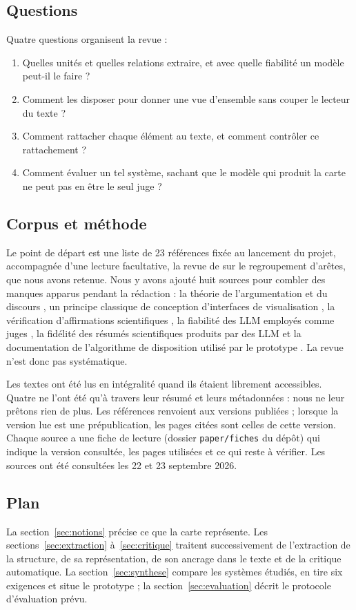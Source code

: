 \subsection{Questions}

Quatre questions organisent la revue :
\begin{enumerate}
  \item Quelles unités et quelles relations extraire, et avec quelle fiabilité un modèle peut-il le faire ?
  \item Comment les disposer pour donner une vue d’ensemble sans couper le lecteur du texte ?
  \item Comment rattacher chaque élément au texte, et comment contrôler ce rattachement ?
  \item Comment évaluer un tel système, sachant que le modèle qui produit la carte ne peut pas en être le seul juge ?
\end{enumerate}

\subsection{Corpus et méthode}

Le point de départ est une liste de 23 références fixée au lancement du projet, accompagnée d’une lecture facultative, la revue de \textcite{ref12b} sur le regroupement d’arêtes, que nous avons retenue. Nous y avons ajouté huit sources pour combler des manques apparus pendant la rédaction : la théorie de l’argumentation et du discours \parencite{ref24,ref25,ref26}, un principe classique de conception d’interfaces de visualisation \parencite{ref27}, la vérification d’affirmations scientifiques \parencite{ref28}, la fiabilité des LLM employés comme juges \parencite{ref29}, la fidélité des résumés scientifiques produits par des LLM \parencite{ref30} et la documentation de l’algorithme de disposition utilisé par le prototype \parencite{ref31}. La revue n’est donc pas systématique.

Les textes ont été lus en intégralité quand ils étaient librement accessibles. Quatre ne l’ont été qu’à travers leur résumé et leurs métadonnées \parencite{ref09,ref10,ref12,ref12b} : nous ne leur prêtons rien de plus. Les références renvoient aux versions publiées ; lorsque la version lue est une prépublication, les pages citées sont celles de cette version. Chaque source a une fiche de lecture (dossier \texttt{paper/fiches} du dépôt) qui indique la version consultée, les pages utilisées et ce qui reste à vérifier. Les sources ont été consultées les 22 et 23 septembre 2026.

\subsection{Plan}

La section~\ref{sec:notions} précise ce que la carte représente. Les sections~\ref{sec:extraction} à~\ref{sec:critique} traitent successivement de l’extraction de la structure, de sa représentation, de son ancrage dans le texte et de la critique automatique. La section~\ref{sec:synthese} compare les systèmes étudiés, en tire six exigences et situe le prototype ; la section~\ref{sec:evaluation} décrit le protocole d’évaluation prévu.
